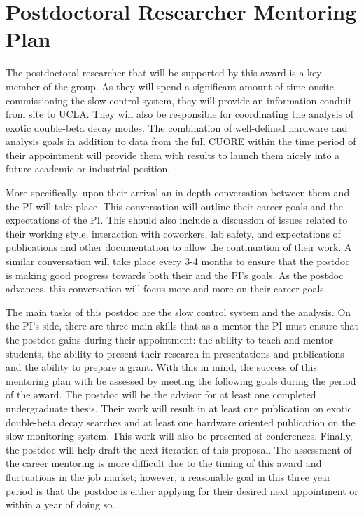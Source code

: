 \section{Postdoctoral Researcher Mentoring Plan}
The postdoctoral researcher that will be supported by this award is a key member of the group. As they will spend a significant amount of time onsite commissioning the slow control system, they will provide an information conduit from site to UCLA. They will also be responsible for coordinating the analysis of exotic double-beta decay modes. The combination of well-defined hardware and analysis goals in addition to data from the full CUORE within the time period of their appointment will provide them with results to launch them nicely into a future academic or industrial position.

More specifically, upon their arrival an in-depth conversation between them and the PI will take place. This conversation will outline their career goals and the expectations of the PI. This should also include a discussion of issues related to their working style, interaction with coworkers, lab safety, and expectations of publications and other documentation to allow the continuation of their work. A similar conversation will take place every 3-4 months to ensure that the postdoc is making good progress towards both their and the PI's goals. As the postdoc advances, this conversation will focus more and more on their career goals.

The main tasks of this postdoc are the slow control system and the analysis. On the PI's side, there are three main skills that as a mentor the PI must  ensure that the postdoc gains during their appointment: the ability to teach and mentor students, the ability to present their research in presentations and publications and the ability to prepare a grant. With this in mind, the success of this mentoring plan with be assessed by meeting the following goals during the period of the award. The postdoc will be the advisor for at least one completed undergraduate thesis. Their work will result in at least one publication on exotic double-beta decay searches and at least one hardware oriented publication on the slow monitoring system. This work will also be presented at conferences. Finally, the postdoc will help draft the next iteration of this proposal.  The assessment of the career mentoring is more difficult due to the timing of this award and fluctuations in the job market; however, a reasonable goal in this three year period is that the postdoc is either applying for their desired next appointment or within a year of doing so.
 